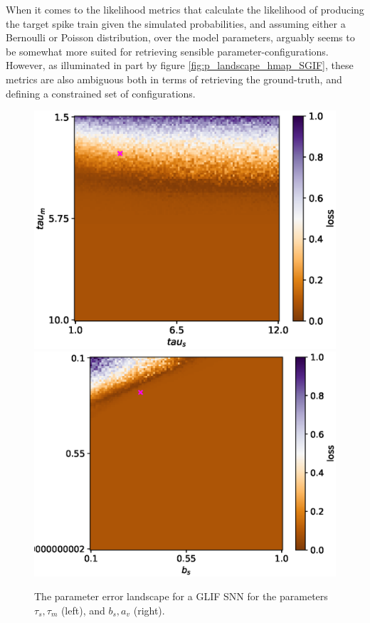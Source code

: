 \documentclass[mphil,deptreport,ianc]{infthesis} %
\begin{document}
When it comes to the likelihood metrics that calculate the likelihood of producing the target spike train given the simulated probabilities, and assuming either a Bernoulli or Poisson distribution, over the model parameters, arguably seems to be somewhat more suited for retrieving sensible parameter-configurations.
However, as illuminated in part by figure \ref{fig:p_landscape_hmap_SGIF}, these metrics are also ambiguous both in terms of retrieving the ground-truth, and defining a constrained set of configurations.


\begin{figure}
    \centering
    \vskip -0.1in
    \includegraphics[width=0.49\columnwidth]{figures/param_landscape_heatmaps/GLIF/test_export_2d_heatmap_N_4_loss_tau_s_tau_m.eps}
    \includegraphics[width=0.49\columnwidth]{figures/param_landscape_heatmaps/GLIF/test_export_2d_heatmap_N_4_loss_b_s_a_v.eps}
    \vskip -0.1in
    \caption{The parameter error landscape for a GLIF SNN for the parameters $\tau_s, \tau_m$ (left), and $b_s, a_v$ (right).}
    \label{fig:p_landscape_hmap_GLIF}
\end{figure}
\end{document}
